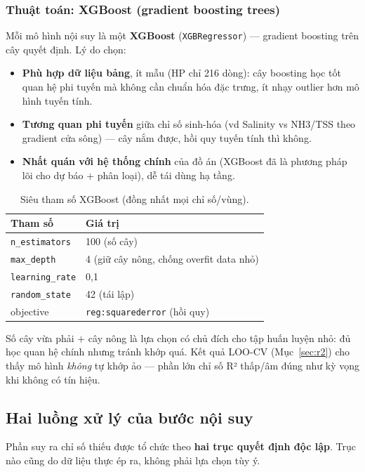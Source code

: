 
\subsubsection{Thuật toán: XGBoost (gradient boosting trees)}
Mỗi mô hình nội suy là một \textbf{XGBoost} (\texttt{XGBRegressor}) --- gradient boosting trên cây quyết định. Lý do chọn:
\begin{itemize}[nosep]
  \item \textbf{Phù hợp dữ liệu bảng}, ít mẫu (HP chỉ 216 dòng): cây boosting học tốt quan hệ phi tuyến mà không cần chuẩn hóa đặc trưng, ít nhạy outlier hơn mô hình tuyến tính.
  \item \textbf{Tương quan phi tuyến} giữa chỉ số sinh-hóa (vd Salinity vs NH3/TSS theo gradient cửa sông) — cây nắm được, hồi quy tuyến tính thì không.
  \item \textbf{Nhất quán với hệ thống chính} của đồ án (XGBoost đã là phương pháp lõi cho dự báo + phân loại), dễ tái dùng hạ tầng.
\end{itemize}

\begin{table}[h]
\centering\small
\caption{Siêu tham số XGBoost (đồng nhất mọi chỉ số/vùng).}
\label{tab:xgb}
\begin{tabular}{ll}
\toprule
\textbf{Tham số} & \textbf{Giá trị} \\
\midrule
\texttt{n\_estimators} & 100 (số cây) \\
\texttt{max\_depth}    & 4 (giữ cây nông, chống overfit data nhỏ) \\
\texttt{learning\_rate}& 0{,}1 \\
\texttt{random\_state} & 42 (tái lập) \\
objective & \texttt{reg:squarederror} (hồi quy) \\
\bottomrule
\end{tabular}
\end{table}

Số cây vừa phải $+$ cây nông là lựa chọn có chủ đích cho tập huấn luyện nhỏ: đủ học quan hệ chính nhưng tránh khớp quá. Kết quả LOO-CV (Mục~\ref{sec:r2}) cho thấy mô hình \emph{không} tự khớp ảo --- phần lớn chỉ số R² thấp/âm đúng như kỳ vọng khi không có tín hiệu.

\subsection{Hai luồng xử lý của bước nội suy}
\label{sec:hailuong}
Phần suy ra chỉ số thiếu được tổ chức theo \textbf{hai trục quyết định độc lập}. Trục nào cũng do dữ liệu thực ép ra, không phải lựa chọn tùy ý.

